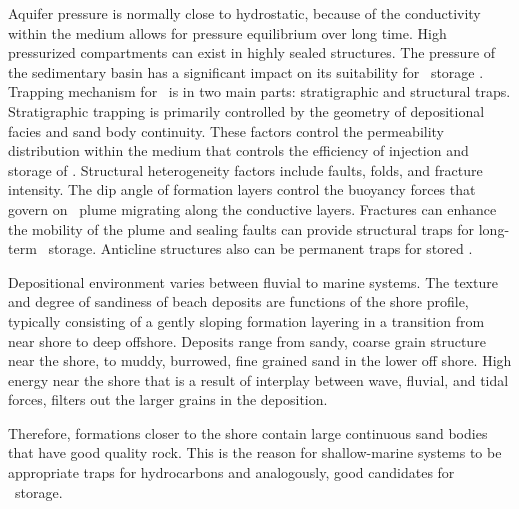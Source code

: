 Aquifer pressure is normally close to hydrostatic, because of the conductivity within the medium allows for pressure equilibrium over long time. High pressurized compartments can exist in highly sealed structures. The pressure of the sedimentary basin has a significant impact on its suitability for \coo\ storage \cite{bachu2000sequestration}. Trapping mechanism for \coo\ is in two main parts: stratigraphic and structural traps. Stratigraphic trapping  is primarily controlled by the geometry of depositional facies and sand body continuity. These factors control the permeability distribution within the medium that controls the efficiency of injection and storage of \coo. Structural heterogeneity factors include faults, folds, and fracture intensity. The dip angle of formation layers control the buoyancy forces that govern on \coo\ plume migrating along the conductive layers. Fractures can enhance the mobility of the plume and sealing faults can provide structural traps for long-term \coo\ storage. Anticline structures also can be permanent traps for stored \coo.

Depositional environment varies between fluvial to marine systems. The texture and degree of sandiness of beach deposits are functions of the shore profile, typically consisting of a gently sloping formation layering in a transition from near shore to deep offshore. Deposits range from sandy, coarse grain structure near the shore, to muddy, burrowed, fine grained sand in the lower off shore. High energy near the shore that is a result of interplay between wave, fluvial, and tidal forces, filters out the larger grains in the deposition.

Therefore, formations closer to the shore contain large continuous sand bodies that have good quality rock. This is the reason for shallow-marine systems to be appropriate traps for hydrocarbons and analogously, good candidates for \coo\ storage.

